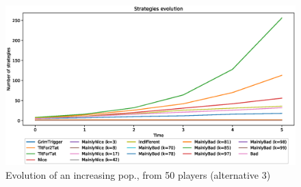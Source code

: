 \documentclass[journal,10pt,twoside]{IEEEtran}
\begin{document}
\begin{figure}
    \centering
    \includegraphics[width=.7\columnwidth]{../img/ripdmp-incr/alt3/ripdmp-evolution-increasing-pop-50}
    \caption{Evolution of an increasing pop., from 50 players (alternative 3)}
    \label{fig:incrRa3}
\end{figure}



\end{document}
